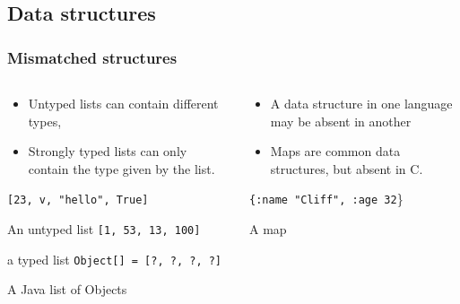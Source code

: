 \documentclass{beamer}
\newcommand{\linespace}{\vskip 0.25cm}
\begin{document}
\begin{frame}
\begin{columns}
\begin{column}{0.5\textwidth}
  \end{column}
  \end{columns}
\end{frame}

\subsection{Data structures}
\begin{frame}
  \frametitle{Mismatched structures}
  
  \begin{columns}
  \begin{column}{0.5\textwidth}
  \begin{itemize}
  	\item Untyped lists can contain different types,
  	\item Strongly typed lists can only contain the type given by the list.
  \end{itemize}
  
  {\tt [23, v, "hello", True]}
  
   An untyped list
\linespace   
  {\tt [1, 53, 13, 100]}
  
  a typed list 
\linespace	
  {\tt Object[] = [?, ?, ?, ?]} 
  
  A Java list of Objects
  \end{column}
  
  \begin{column}{0.6\textwidth}

  
  \begin{itemize}
  \item A data structure in one language may be absent in another
  \item Maps are common data structures, but absent in C.
  \end{itemize}
  \linespace
  {\tt \{:name "Cliff", :age 32}\}
  
  A map
  \end{column}
  \end{columns}
\end{frame}
\end{document}
